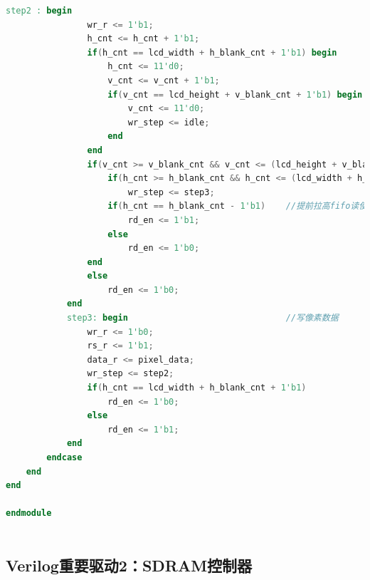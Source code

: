 \documentclass[12pt,hyperref,a4paper,UTF8]{ctexart}
\begin{document}
\begin{lstlisting}[language=Verilog]
            step2 : begin
                wr_r <= 1'b1;
                h_cnt <= h_cnt + 1'b1;
                if(h_cnt == lcd_width + h_blank_cnt + 1'b1) begin
                    h_cnt <= 11'd0;
                    v_cnt <= v_cnt + 1'b1;
                    if(v_cnt == lcd_height + v_blank_cnt + 1'b1) begin
                        v_cnt <= 11'd0;
                        wr_step <= idle;
                    end                        
                end  
                if(v_cnt >= v_blank_cnt && v_cnt <= (lcd_height + v_blank_cnt)) begin
                    if(h_cnt >= h_blank_cnt && h_cnt <= (lcd_width + h_blank_cnt))
                        wr_step <= step3;  
                    if(h_cnt == h_blank_cnt - 1'b1)    //提前拉高fifo读使能信号
                        rd_en <= 1'b1;
                    else
                        rd_en <= 1'b0;                           
                end  
                else
                    rd_en <= 1'b0;     
            end
            step3: begin                               //写像素数据
                wr_r <= 1'b0;
                rs_r <= 1'b1;                                       
                data_r <= pixel_data;                                        
                wr_step <= step2;
                if(h_cnt == lcd_width + h_blank_cnt + 1'b1)
                    rd_en <= 1'b0;
                else    
                    rd_en <= 1'b1;
            end
        endcase     
    end
end   

endmodule 



\end{lstlisting}

\subsection{Verilog重要驱动2：SDRAM控制器}
\end{document}
